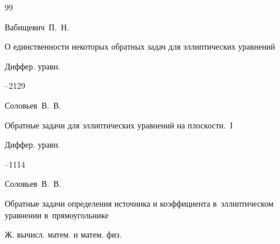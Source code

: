 \begin{thebibliography}{99}




\by Вабищевич~П.~Н.

\paper О единственности некоторых обратных задач для эллиптических уравнений

\jour Диффер. уравн.




--2129










\by Соловьев~В.~В.


\paper Обратные задачи для эллиптических уравнений на плоскости.~I

\jour Диффер. уравн.




--1114









\by Соловьев~В.~В.

\paper Обратные задачи определения источника и коэффициента в~эллиптическом уравнении в~прямоугольнике

\jour Ж. вычисл. матем. и матем. физ.


\end{thebibliography}
